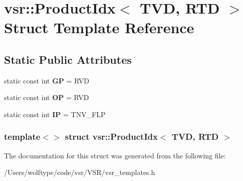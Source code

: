 \hypertarget{structvsr_1_1_product_idx_3_01_t_v_d_00_01_r_t_d_01_4}{\section{vsr\-:\-:Product\-Idx$<$ T\-V\-D, R\-T\-D $>$ Struct Template Reference}
\label{structvsr_1_1_product_idx_3_01_t_v_d_00_01_r_t_d_01_4}
}
\subsection*{Static Public Attributes}
\begin{DoxyCompactItemize}
\item 
\hypertarget{structvsr_1_1_product_idx_3_01_t_v_d_00_01_r_t_d_01_4_abd2ef83ad7dc00f25c16609cac336891}{static const int {\bfseries G\-P} = R\-V\-D}\label{structvsr_1_1_product_idx_3_01_t_v_d_00_01_r_t_d_01_4_abd2ef83ad7dc00f25c16609cac336891}

\item 
\hypertarget{structvsr_1_1_product_idx_3_01_t_v_d_00_01_r_t_d_01_4_a91369d1ef3430c7e09577152f94fa86c}{static const int {\bfseries O\-P} = R\-V\-D}\label{structvsr_1_1_product_idx_3_01_t_v_d_00_01_r_t_d_01_4_a91369d1ef3430c7e09577152f94fa86c}

\item 
\hypertarget{structvsr_1_1_product_idx_3_01_t_v_d_00_01_r_t_d_01_4_a7f2aa0578a46d9ca8e417078ae5c10c5}{static const int {\bfseries I\-P} = T\-N\-V\-\_\-\-F\-L\-P}\label{structvsr_1_1_product_idx_3_01_t_v_d_00_01_r_t_d_01_4_a7f2aa0578a46d9ca8e417078ae5c10c5}

\end{DoxyCompactItemize}
\subsubsection*{template$<$$>$ struct vsr\-::\-Product\-Idx$<$ T\-V\-D, R\-T\-D $>$}



The documentation for this struct was generated from the following file\-:\begin{DoxyCompactItemize}
\item 
/\-Users/wolftype/code/vsr/\-V\-S\-R/vsr\-\_\-templates.\-h\end{DoxyCompactItemize}
